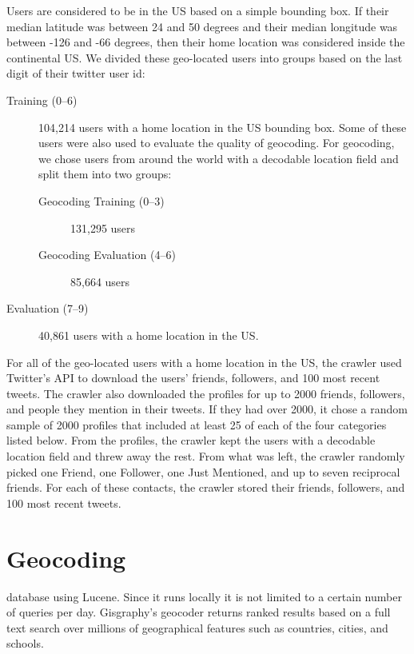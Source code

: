 Users are considered to be in the US based on a simple bounding box.  If their
median latitude was between 24 and 50 degrees and their median longitude was
between -126 and -66 degrees, then their home location was considered inside
the continental US.
We divided these geo-located users into groups based on the last digit of their
twitter user id:
\begin{description}
\item[Training (0--6)] 104,214 users with a home location in the US bounding
box. Some of these users were also used to evaluate the quality of geocoding.
For geocoding, we chose users from around the world with a decodable location
field and split them into two groups:
\begin{description}
\item[Geocoding Training (0--3)] 131,295 users
\item[Geocoding Evaluation (4--6)] 85,664 users
\end{description}
\item[Evaluation (7--9)] 40,861 users with a home location in the US.
\end{description}

For all of the geo-located users with a home location in the US, the crawler
used Twitter's API to download the users' friends, followers, and 100 most
recent tweets.
The crawler also downloaded the profiles for up to 2000 friends, followers, and
people they mention in their tweets. If they had over 2000, it chose a random
sample of 2000 profiles that included at least 25 of each of the four
categories listed below.
From the profiles, the crawler kept the users with a decodable location field
and threw away the rest. From what was left, the crawler randomly picked one
Friend, one Follower, one Just Mentioned, and up to seven reciprocal friends.
For each of these contacts, the crawler stored their friends, followers, and
100 most recent tweets.

\section{Geocoding}
database using Lucene. Since
it runs locally it is not limited to a certain number of queries per day.
Gisgraphy's geocoder returns ranked results based on a full text search
over millions of geographical features such as countries, cities, and schools. 

